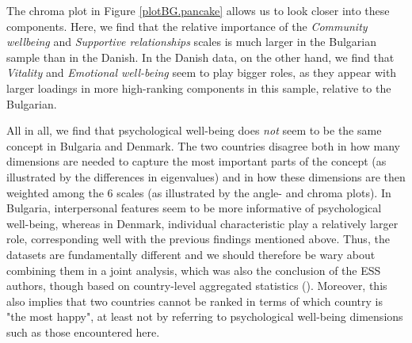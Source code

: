 \documentclass[titlepage,11pt,twoside]{article}
\begin{document}
The chroma plot in Figure \ref{plotBG.pancake} allows us to look closer into these components. Here, we find that the relative importance of the \textit{Community wellbeing} and \textit{Supportive relationships} scales is much larger in the Bulgarian sample than in the Danish. In the Danish data, on the other hand, we find that \textit{Vitality} and \textit{Emotional well-being} seem to play bigger roles, as they appear with larger loadings in more high-ranking components in this sample, relative to the Bulgarian.

All in all, we find that psychological well-being does \textit{not} seem to be the same concept in Bulgaria and Denmark. The two countries disagree both in how many dimensions are needed to capture the most important parts of the concept (as illustrated by the differences in eigenvalues) and in how these dimensions are then weighted among the 6 scales (as illustrated by the angle- and chroma plots). In Bulgaria, interpersonal features seem to be more informative of psychological well-being, whereas in Denmark, individual characteristic play a relatively larger role, corresponding well with the previous findings mentioned above. Thus, the datasets are fundamentally different and we should therefore be wary about combining them in a joint analysis, which was also the conclusion of the ESS authors, though based on country-level aggregated statistics (\cite{ESStopline5}). Moreover, this also implies that two countries cannot be ranked in terms of which country is "the most happy", at least not by referring to psychological well-being dimensions such as those encountered here. 

\end{document}

